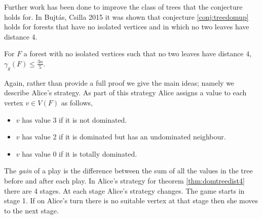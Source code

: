%    
%    
Further work has been done to improve the class of trees that the conjecture holds for. In Bujt\'{a}s, Csilla 2015 \cite{Bujt2015} it was shown that conjecture \ref{conj:treedomup} holds for forests that have no isolated vertices and in which no two leaves have distance 4.
%
\begin{theorem}\label{thm:domtreedist4}
    For $F$ a forest with no isolated vertices such that no two leaves have distance 4,
    $\gamma_g(F)\leq \frac{3n}{5}$.
\end{theorem}
Again, rather than provide a full proof we give the main ideas; namely we describe Alice's strategy. As part of this strategy Alice assigns a value to each vertex $v\in V(F)$ as follows, 
\begin{itemize}
    \item $v$ has value 3 if it is not dominated.
    \item $v$ has value 2 if it is dominated but has an undominated neighbour.
    \item $v$ has value 0 if it is totally dominated.
\end{itemize}
The \textit{gain} of a play is the difference between the sum of all the values in the tree before and after each play. In Alice's strategy for theorem \ref{thm:domtreedist4} there are 4 stages. At each stage Alice's strategy changes. The game starts in stage 1. If on Alice's turn there is no suitable vertex at that stage then she moves to the next stage. 
